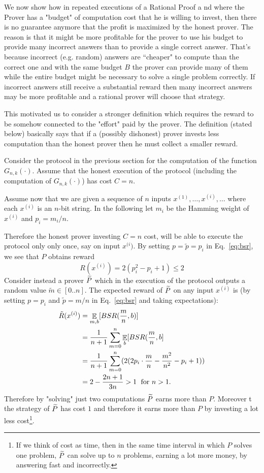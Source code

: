 We now show how in repeated executions of a Rational Proof a nd where the Prover has a "budget" of computation cost that he is willing to invest, then there is no guarantee anymore that the profit is maximized by the honest prover. The reason is that it might be more profitable for the prover to use his budget to provide many incorrect answers than to provide a single correct answer. That's because incorrect (e.g. random) answers are ``cheaper" to compute than the correct one and with the same budget $B$ the prover can provide many of them while the entire budget might be necessary to solve a single problem correctly. If incorrect answers still receive a substantial reward then many incorrect answers may be more profitable and a rational prover will choose that strategy. 


This motivated us to consider a stronger definition which requires the reward to be 
somehow connected to the "effort" paid by the prover. The definition (stated below) basically says that if a (possibly dishonest) prover invests less computation than the honest prover then he must collect a smaller reward. 

Consider the protocol in the previous section for the computation of the function 
$G_{n,k}(\cdot)$. Assume that the honest execution of the protocol (including the computation of $G_{n,k}(\cdot)$) has cost $C=n$. 

Assume now that we are given a sequence of $n$ inputs 
$x^{(1)},\ldots,x^{(i)},\ldots$ where each $x^{(i)}$ is an $n$-bit string. 
In the following let $m_i$ be the Hamming weight of $x^{(i)}$ and $p_i=m_i/n$.

Therefore the honest prover investing $C=n$ cost, will be able to execute the protocol only only once, say on input $x^{(i})$.  By setting $p=\tilde{p}=p_i$ in Eq.~\ref{eq:bsr}, we see that $P$ obtains reward 
\[ R(x^{(i)}) = 2(p_i^2-p_i+1) \leq 2 \]
Consider instead a prover $\widetilde{P}$ which in the execution of the protocol outputs a random value $\tilde{m} \in [0..n]$. The expected reward of $\widetilde{P}$ on {\sf any} input $x^{(i)}$ is (by setting $p=p_i$ and $\tilde{p}=m/n$ in Eq.~\ref{eq:bsr} and taking 
expectations):
\begin{align*}
\tilde{R}(x^{(i)}) &= \mathop{\mathbb{E}}_{m,b}[BSR(\frac{m}{n}, b)] \\
                &= \frac{1}{n+1}\sum_{m=0}^{n}\mathop{\mathbb{E}}_b[BSR(\frac{m}{n},b] \\
                &= 
                \frac{1}{n+1}\sum_{m=0}^{n}(2(2p_i \cdot \frac{m}{n}-\frac{m^2}{n^2}-p_i+1))
                 \\
                 &=2-\frac{2n+1}{3n} > 1 \; \mbox{ for $n>1$.}
\end{align*}
Therefore by "solving" just two computations $\widetilde{P}$ earns more than $P$. Moreover t
the strategy of $\widetilde{P}$ has cost $1$ and 
therefore it earns more than $P$ by investing a lot less cost\footnote{
If we think of cost as time, then in the same time interval in which $P$ solves one problem, $\widetilde{P}$ can solve up to $n$ problems, earning a lot 
more money, by answering fast and incorrectly.}.

